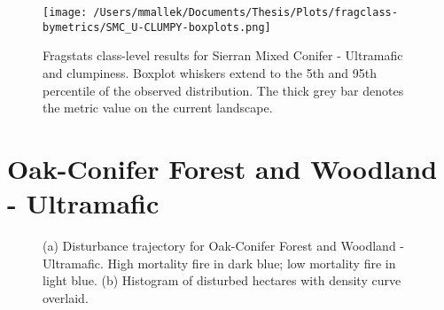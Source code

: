 \begin{figure}[!htbp]
\centering
    \texttt{[image: /Users/mmallek/Documents/Thesis/Plots/fragclass-bymetrics/SMC\_U-CLUMPY-boxplots.png]}
  \caption{Fragstats class-level results for Sierran Mixed Conifer - Ultramafic and clumpiness. Boxplot whiskers extend to the 5th and 95th percentile of the observed distribution. The thick grey bar denotes the metric value on the current landscape.}
  \label{fig:smcu_clumpy}
\end{figure}




\clearpage
\section{Oak-Conifer Forest and Woodland - Ultramafic} 

\begin{figure}[!htbp]
  \centering
  \caption{\small (a) Disturbance trajectory for Oak-Conifer Forest and Woodland - Ultramafic. High mortality fire in dark blue; low mortality fire in light blue. (b) Histogram of disturbed hectares with density curve overlaid.} 
  \label{fig:darea_ocfwu}
\end{figure}

